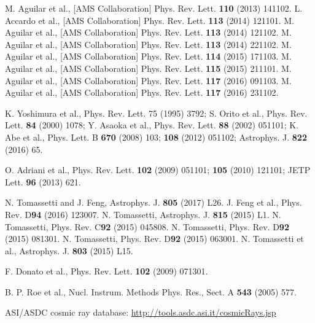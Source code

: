 \documentclass[twocolumn,twoside,slac_two]{revtex4-1}
\begin{document}
%
\begin{thebibliography}{9}   %

 M. Aguilar et al., [AMS Collaboration] Phys. Rev. Lett. {\bf 110} (2013) 141102.
 L. Accardo et al., [AMS Collaboration] Phys. Rev. Lett. {\bf 113} (2014) 121101.
 M. Aguilar et al., [AMS Collaboration] Phys. Rev. Lett. {\bf 113} (2014) 121102.
 M. Aguilar et al., [AMS Collaboration] Phys. Rev. Lett. {\bf 113} (2014) 221102.
 M. Aguilar et al., [AMS Collaboration] Phys. Rev. Lett. {\bf 114} (2015) 171103.
 M. Aguilar et al., [AMS Collaboration] Phys. Rev. Lett. {\bf 115} (2015) 211101.
 M. Aguilar et al., [AMS Collaboration] Phys. Rev. Lett. {\bf 117} (2016) 091103.
 M. Aguilar et al., [AMS Collaboration] Phys. Rev. Lett. {\bf 117} (2016) 231102.

     K. Yoshimura et al., Phys. Rev. Lett. {\bf}75 (1995) 3792;
  S. Orito et al., Phys. Rev. Lett. {\bf 84} (2000) 1078;
  Y. Asaoka et al., Phys. Rev. Lett. {\bf 88} (2002) 051101;
  K. Abe et al., Phys. Lett. B {\bf 670} (2008) 103;
  {\bf 108} (2012) 051102;
  Astrophys. J. {\bf 822} (2016) 65.

 O. Adriani et al., Phys. Rev. Lett. {\bf 102} (2009) 051101;
  {\bf 105} (2010) 121101;
  JETP Lett. {\bf 96} (2013) 621.

  
 N. Tomassetti and J. Feng, Astrophys. J. {\bf 805} (2017) L26. 
 J. Feng et al., Phys. Rev. D{\bf 94} (2016) 123007.
 N. Tomassetti, Astrophys. J. {\bf 815} (2015) L1.
 N. Tomassetti, Phys. Rev. C{\bf 92} (2015) 045808.
 N. Tomassetti, Phys. Rev. D{\bf 92} (2015) 081301.
 N. Tomassetti, Phys. Rev. D{\bf 92} (2015) 063001.
 N. Tomassetti et al., Astrophys. J. {\bf 803} (2015) L15.

 F. Donato et al., Phys. Rev. Lett. {\bf 102} (2009) 071301.

 B. P. Roe et al., Nucl. Instrum. Methods Phys. Res., Sect. A {\bf 543} (2005) 577.
  
  
 ASI/ASDC cosmic ray database: \href{http://tools.asdc.asi.it/cosmicRays.jsp}{http://tools.asdc.asi.it/cosmicRays.jsp}



  
  


\end{thebibliography}
\end{document}
